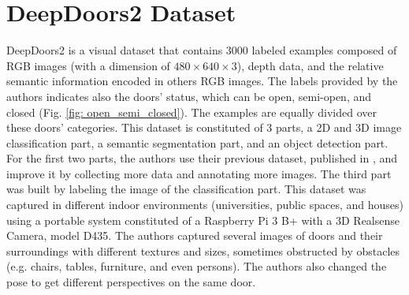 \section{DeepDoors2 Dataset}
DeepDoors2 \cite{deepdoors2} is a visual dataset that contains 3000 labeled examples composed of  RGB images (with a dimension of $480 \times 640 \times 3$), depth data, and the relative semantic information encoded in others RGB images. The labels provided by the authors indicates also the doors' status, which can be open, semi-open, and closed (Fig. \ref{fig: open_semi_closed}). The examples are equally divided over these doors' categories.  This dataset is constituted of 3 parts, a 2D and 3D image classification part, a semantic segmentation part, and an object detection part. For the first two parts, the authors use their previous
dataset, published in \cite{deepdoors1}, and improve it by collecting more data and annotating more images. The third part was built by labeling the image of the classification part. This dataset was captured in different indoor environments (universities, public spaces, and houses) using a portable system constituted of a Raspberry Pi 3 B+ with a 3D Realsense Camera, model D435. The authors captured several images of doors and their surroundings with different textures and sizes, sometimes obstructed by obstacles (e.g. chairs, tables, furniture, and even persons). The authors also changed the pose to get different perspectives on the same door. 

